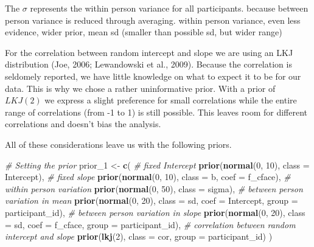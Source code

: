 \documentclass[
  doc,12pt,floatsintext]{apa7}
\newenvironment{Shaded}{\begin{snugshade}}{\end{snugshade}}
\newcommand{\AttributeTok}[1]{\textcolor[rgb]{0.13,0.29,0.53}{#1}}
\newcommand{\CommentTok}[1]{\textcolor[rgb]{0.56,0.35,0.01}{\textit{#1}}}
\newcommand{\DecValTok}[1]{\textcolor[rgb]{0.00,0.00,0.81}{#1}}
\newcommand{\FunctionTok}[1]{\textcolor[rgb]{0.13,0.29,0.53}{\textbf{#1}}}
\newcommand{\NormalTok}[1]{#1}
\newcommand{\OtherTok}[1]{\textcolor[rgb]{0.56,0.35,0.01}{#1}}
\begin{document}
The \(\sigma\) represents the within person variance for all participants. because between person variance is reduced through averaging.
within person variance, even less evidence, wider prior, mean sd (smaller than possible sd, but wider range)

For the correlation between random intercept and slope we are using an LKJ distribution (Joe, 2006; Lewandowski et al., 2009). Because the correlation is seldomely reported, we have little knowledge on what to expect it to be for our data. This is why we chose a rather uninformative prior. With a prior of \(LKJ(2)\) we express a slight preference for small correlations while the entire range of correlations (from -1 to 1) is still possible. This leaves room for different correlations and doesn't bias the analysis.

All of these considerations leave us with the following priors.

\begin{Shaded}
\begin{Highlighting}[]
\CommentTok{\# Setting the prior}
\NormalTok{prior\_1 }\OtherTok{\textless{}{-}} \FunctionTok{c}\NormalTok{(}
  \CommentTok{\# fixed Intercept}
  \FunctionTok{prior}\NormalTok{(}\FunctionTok{normal}\NormalTok{(}\DecValTok{0}\NormalTok{, }\DecValTok{10}\NormalTok{), }\AttributeTok{class =}\NormalTok{ Intercept), }
  \CommentTok{\# fixed slope}
  \FunctionTok{prior}\NormalTok{(}\FunctionTok{normal}\NormalTok{(}\DecValTok{0}\NormalTok{, }\DecValTok{10}\NormalTok{), }\AttributeTok{class =}\NormalTok{ b, }\AttributeTok{coef =}\NormalTok{ f\_cface), }
  \CommentTok{\# within person variation}
  \FunctionTok{prior}\NormalTok{(}\FunctionTok{normal}\NormalTok{(}\DecValTok{0}\NormalTok{, }\DecValTok{50}\NormalTok{), }\AttributeTok{class =}\NormalTok{ sigma), }
  \CommentTok{\# between person variation in mean}
  \FunctionTok{prior}\NormalTok{(}\FunctionTok{normal}\NormalTok{(}\DecValTok{0}\NormalTok{, }\DecValTok{20}\NormalTok{), }\AttributeTok{class =}\NormalTok{ sd, }\AttributeTok{coef =}\NormalTok{ Intercept, }
        \AttributeTok{group =}\NormalTok{ participant\_id), }
  \CommentTok{\# between person variation in slope}
  \FunctionTok{prior}\NormalTok{(}\FunctionTok{normal}\NormalTok{(}\DecValTok{0}\NormalTok{, }\DecValTok{20}\NormalTok{), }\AttributeTok{class =}\NormalTok{ sd, }\AttributeTok{coef =}\NormalTok{ f\_cface, }
        \AttributeTok{group =}\NormalTok{ participant\_id), }
  \CommentTok{\# correlation between random intercept and slope}
  \FunctionTok{prior}\NormalTok{(}\FunctionTok{lkj}\NormalTok{(}\DecValTok{2}\NormalTok{), }\AttributeTok{class =}\NormalTok{ cor, }\AttributeTok{group =}\NormalTok{ participant\_id)}
\NormalTok{) }
\end{Highlighting}
\end{Shaded}
\end{document}

